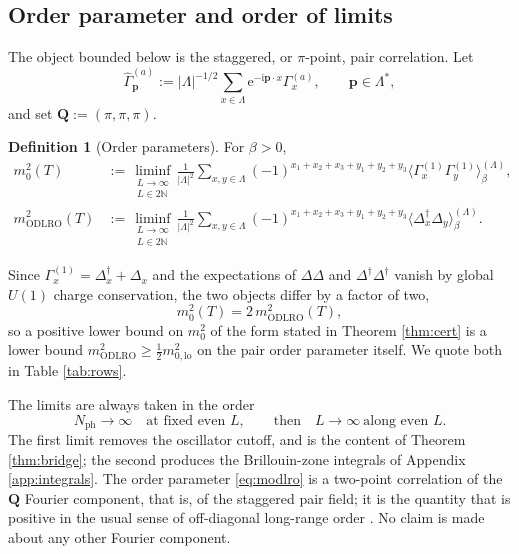 \documentclass[11pt]{article}
\numberwithin{equation}{section}
\newcommand{\e}{\mathrm{e}}
\newcommand{\ii}{\mathrm{i}}
\newcommand{\N}{\mathbb{N}}
\newcommand{\Lamb}{\Lambda}
\newcommand{\Lambstar}{\Lambda^{*}}
\newcommand{\ODLRO}{\mathrm{ODLRO}}
\newcommand{\Gam}{\Gamma}
\newcommand{\fN}{N_{\mathrm{ph}}}
\theoremstyle{definition}
\newtheorem{definition}[theorem]{Definition}
\begin{document}
\subsection{Order parameter and order of limits}

The object bounded below is the staggered, or $\pi$-point, pair correlation. Let
\begin{equation}
\hat\Gam^{(a)}_{\mathbf p}:=|\Lamb|^{-1/2}\sum_{x\in\Lamb}\e^{-\ii\mathbf p\cdot x}\Gam^{(a)}_{x},
\qquad \mathbf p\in\Lambstar ,
\end{equation}
and set $\mathbf Q:=(\pi,\pi,\pi)$.

\begin{definition}[Order parameters]\label{def:order}
For $\beta>0$,
\begin{align}
m_{0}^{2}(T)&:=\liminf_{\substack{L\to\infty\\ L\in2\N}}
\frac{1}{|\Lamb|^{2}}\sum_{x,y\in\Lamb}(-1)^{x_{1}+x_{2}+x_{3}+y_{1}+y_{2}+y_{3}}
\big\langle\Gam^{(1)}_{x}\Gam^{(1)}_{y}\big\rangle^{(\Lamb)}_{\beta},
\label{eq:m0}\\
m^{2}_{\ODLRO}(T)&:=\liminf_{\substack{L\to\infty\\ L\in2\N}}
\frac{1}{|\Lamb|^{2}}\sum_{x,y\in\Lamb}(-1)^{x_{1}+x_{2}+x_{3}+y_{1}+y_{2}+y_{3}}
\big\langle\Delta_{x}^{\dagger}\Delta_{y}\big\rangle^{(\Lamb)}_{\beta}.
\label{eq:modlro}
\end{align}
\end{definition}

Since $\Gam^{(1)}_{x}=\Delta_{x}^{\dagger}+\Delta_{x}$ and the expectations of
$\Delta\Delta$ and $\Delta^{\dagger}\Delta^{\dagger}$ vanish by global $U(1)$ charge conservation,
the two objects differ by a factor of two,
\begin{equation}
m_{0}^{2}(T)=2\,m^{2}_{\ODLRO}(T),
\label{eq:factor2}
\end{equation}
so a positive lower bound on $m_{0}^{2}$ of the form stated in Theorem \ref{thm:cert}
is a lower bound $m^{2}_{\ODLRO}\ge\frac12 m_{0,\mathrm{lo}}^{2}$ on the pair order
parameter itself. We quote both in Table \ref{tab:rows}.

The limits are always taken in the order
\begin{equation}
\fN\to\infty\quad\text{at fixed even }L,\qquad\text{then}\quad L\to\infty\ \text{along even }L .
\label{eq:order}
\end{equation}
The first limit removes the oscillator cutoff, and is the content of Theorem
\ref{thm:bridge}; the second produces the Brillouin-zone integrals of Appendix
\ref{app:integrals}. The order parameter \eqref{eq:modlro} is a two-point correlation of the
$\mathbf Q$ Fourier component, that is, of the staggered pair field; it is the quantity
that is positive in the usual sense of off-diagonal long-range order
\cite{yang1989,lieb1989}. No claim is made about any other Fourier component.
\end{document}
